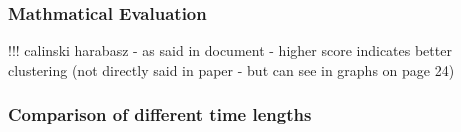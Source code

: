 \subsubsection{Mathmatical Evaluation}
!!! calinski harabasz - as said in document - higher score indicates better clustering (not directly said in paper - but can see in graphs on page 24)


\subsubsection{Comparison of different time lengths}
